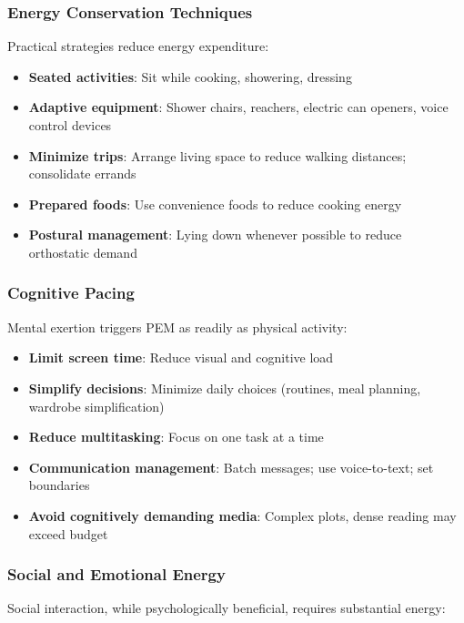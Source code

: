 \subsubsection{Energy Conservation Techniques}

Practical strategies reduce energy expenditure:

\begin{itemize}
    \item \textbf{Seated activities}: Sit while cooking, showering, dressing
    \item \textbf{Adaptive equipment}: Shower chairs, reachers, electric can openers, voice control devices
    \item \textbf{Minimize trips}: Arrange living space to reduce walking distances; consolidate errands
    \item \textbf{Prepared foods}: Use convenience foods to reduce cooking energy
    \item \textbf{Postural management}: Lying down whenever possible to reduce orthostatic demand
\end{itemize}

\subsubsection{Cognitive Pacing}

Mental exertion triggers PEM as readily as physical activity:

\begin{itemize}
    \item \textbf{Limit screen time}: Reduce visual and cognitive load
    \item \textbf{Simplify decisions}: Minimize daily choices (routines, meal planning, wardrobe simplification)
    \item \textbf{Reduce multitasking}: Focus on one task at a time
    \item \textbf{Communication management}: Batch messages; use voice-to-text; set boundaries
    \item \textbf{Avoid cognitively demanding media}: Complex plots, dense reading may exceed budget
\end{itemize}

\subsubsection{Social and Emotional Energy}

Social interaction, while psychologically beneficial, requires substantial energy:

